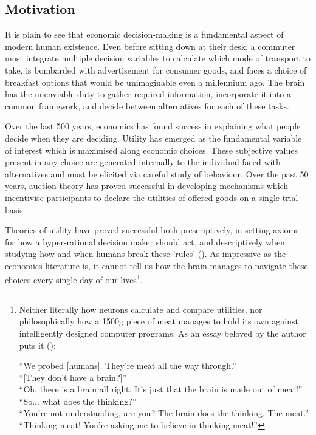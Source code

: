 
\begin{summary}

\subsection*{Motivation}
It is plain to see that economic decision-making is a fundamental aspect of modern human existence. Even before sitting down at their desk, a commuter must integrate multiple decision variables to calculate which mode of transport to take, is bombarded with advertisement for consumer goods, and faces a choice of breakfast options that would be unimaginable even a millennium ago. The brain has the unenviable duty to gather required information, incorporate it into a common framework, and decide between alternatives for each of these tasks.

Over the last 500 years, economics has found success in explaining what people decide when they are deciding. Utility has emerged as the fundamental variable of interest which is maximised along economic choices. These subjective values present in any choice are generated internally to the individual faced with alternatives and must be elicited via careful study of behaviour. Over the past 50 years, auction theory has proved successful in developing mechanisms which incentivise participants to declare the utilities of offered goods on a single trial basis.

Theories of utility have proved successful both prescriptively, in setting axioms for how a hyper-rational decision maker should act, and descriptively when studying how and when humans break these 'rules' (\cite{luce2000utility}). As impressive as the economics literature is, it cannot tell us how the brain manages to navigate these choices every single day of our lives\footnote{Neither literally how neurons calculate and compare utilities, nor philosophically how a 1500g piece of meat manages to hold its own against intelligently designed computer programs. As an essay beloved by the author puts it (\cite{bisson1991theyre}):

``We probed [humans]. They're meat all the way through.''\\
``[They don't have a brain?]''\\
``Oh, there is a brain all right. It's just that the brain is made out of meat!''\\
``So... what does the thinking?''\\
``You're not understanding, are you? The brain does the thinking. The meat.''\\
``Thinking meat! You're asking me to believe in thinking meat!''}.



\end{summary}
